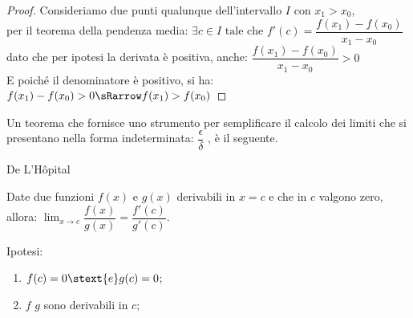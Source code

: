 \bigskip
\begin{proof}
Consideriamo due punti qualunque dell'intervallo \(I\) con \(x_1 > x_0\), 
\\[2mm]
per il teorema della pendenza media: \hspace{22mm} 
\(\exists c \in I \text { tale che } 
  f'(c) = \dfrac{f(x_1)-f(x_0)}{x_1-x_0}\) \\
dato che per ipotesi la derivata è positiva, anche: \hspace{3.5mm}
\(\dfrac{f(x_1)-f(x_0)}{x_1-x_0}>0 \)\\[3mm]
E poiché il denominatore è positivo, si ha: \hspace{14.5mm}
\(f(x_1)-f(x_0)>0 \sRarrow f(x_1)>f(x_0)\)
\end{proof}

\bigskip
Un teorema che fornisce uno strumento per semplificare il calcolo dei 
limiti che si presentano nella forma indeterminata: 
\(\dfrac{\epsilon}{\delta}\) %
, è il seguente.


\begin{newtheo}{De L'H\^opital}{}

Date due funzioni \(f(x)\) e \(g(x)\) derivabili in \(x = c\) 
e che in \(c\) valgono zero, allora: \qquad 
\(\displaystyle \lim_{x \to c} \dfrac{f(x)}{g(x)} = 
  \dfrac{f'(c)}{g'(c)}\).
% 

\end{newtheo}

\noindent Ipotesi: 
\begin{enumerate}[nosep]
 \item \(f(c) = 0 \stext{e} g(c) = 0\);
 \item \(f\) \(g\) sono derivabili in \(c\);
\end{enumerate}

